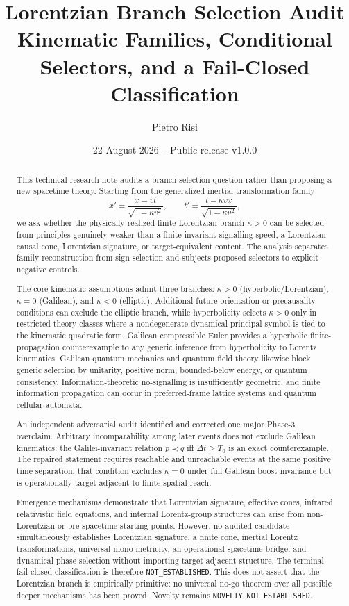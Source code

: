 \documentclass[11pt,a4paper]{article}
\title{\bfseries Lorentzian Branch Selection Audit\\[0.25em]
\large Kinematic Families, Conditional Selectors, and a Fail-Closed Classification}
\author{Pietro Risi}
\date{22 August 2026 \quad -- \quad Public release v1.0.0}
\newcommand{\kap}{\kappa}
\newcommand{\status}[1]{\texttt{#1}}
\begin{document}
\maketitle

\begin{abstract}
This technical research note audits a branch-selection question rather than proposing a new spacetime theory.  Starting from the generalized inertial transformation family
\[
x'=\frac{x-vt}{\sqrt{1-\kap v^2}},\qquad
t'=\frac{t-\kap vx}{\sqrt{1-\kap v^2}},
\]
we ask whether the physically realized finite Lorentzian branch $\kap>0$ can be selected from principles genuinely weaker than a finite invariant signalling speed, a Lorentzian causal cone, Lorentzian signature, or target-equivalent content.  The analysis separates family reconstruction from sign selection and subjects proposed selectors to explicit negative controls.

The core kinematic assumptions admit three branches: $\kap>0$ (hyperbolic/Lorentzian), $\kap=0$ (Galilean), and $\kap<0$ (elliptic).  Additional future-orientation or precausality conditions can exclude the elliptic branch, while hyperbolicity selects $\kap>0$ only in restricted theory classes where a nondegenerate dynamical principal symbol is tied to the kinematic quadratic form.  Galilean compressible Euler provides a hyperbolic finite-propagation counterexample to any generic inference from hyperbolicity to Lorentz kinematics.  Galilean quantum mechanics and quantum field theory likewise block generic selection by unitarity, positive norm, bounded-below energy, or quantum consistency.  Information-theoretic no-signalling is insufficiently geometric, and finite information propagation can occur in preferred-frame lattice systems and quantum cellular automata.

An independent adversarial audit identified and corrected one major Phase-3 overclaim.  Arbitrary incomparability among later events does not exclude Galilean kinematics: the Galilei-invariant relation $p\prec q$ iff $\Delta t\ge T_0$ is an exact counterexample.  The repaired statement requires reachable and unreachable events at the same positive time separation; that condition excludes $\kap=0$ under full Galilean boost invariance but is operationally target-adjacent to finite spatial reach.

Emergence mechanisms demonstrate that Lorentzian signature, effective cones, infrared relativistic field equations, and internal Lorentz-group structures can arise from non-Lorentzian or pre-spacetime starting points.  However, no audited candidate simultaneously establishes Lorentzian signature, a finite cone, inertial Lorentz transformations, universal mono-metricity, an operational spacetime bridge, and dynamical phase selection without importing target-adjacent structure.  The terminal fail-closed classification is therefore \status{NOT\_ESTABLISHED}.  This does not assert that the Lorentzian branch is empirically primitive: no universal no-go theorem over all possible deeper mechanisms has been proved.  Novelty remains \status{NOVELTY\_NOT\_ESTABLISHED}.
\end{abstract}
\end{document}
